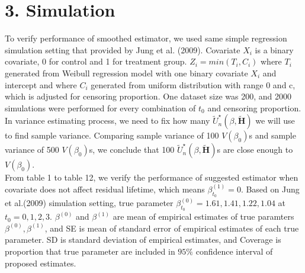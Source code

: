\documentclass[12pt]{article}
\begin{document}
\newpage
\section{3. Simulation}
	To verify performance of smoothed estimator, we used same simple regression simulation setting that provided by Jung et al. (2009). Covariate $X_i$ is a binary covariate, 0 for control and 1 for treatment group. $Z_i = min(T_i, C_i)$ where $T_i$ generated from Weibull regression model with one binary covariate $X_i$ and intercept and where $C_i$ generated from uniform distribution with range 0 and c, which is adjusted for censoring proportion. One dataset size was 200, and 2000 simulations were performed for every combination of $t_0$ and censoring proportion. In variance estimating process, we need to fix how many $\tilde{U}^{\star }_n(\beta, \tilde{\textbf{H}})$ we will use to find sample variance. Comparing sample variance of 100 $V(\beta_0)$s and sample variance of 500 $V(\beta_0)$s, we conclude that 100 $\tilde{U}^{\star }_n(\beta, \tilde{\textbf{H}})$s are close enough to $V(\beta_0)$.\\
	
	From table 1 to table 12, we verify the performance of suggested estimator when covariate does not affect residual lifetime, which means $\beta_{t_0}^{(1)} = 0$. Based on Jung et al.(2009) simulation setting, true parameter $\beta_{t_0}^{(0)} = 1.61, 1.41, 1.22, 1.04$ at $t_0 = 0, 1, 2, 3$. $\beta^(0)$ and $\beta^(1)$ are mean of empirical estimates of true paramters $\beta^(0), \beta^(1)$, and SE is mean of standard error of empirical estimates of each true parameter. SD is standard deviation of empirical estimates, and Coverage is proportion that true parameter are included in $95\%$ confidence interval of proposed estimates. 
	
\end{document}
